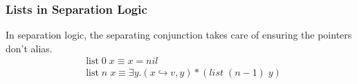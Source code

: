 \documentclass{beamer}
\begin{document}
\begin{frame}
\frametitle{Lists in Separation Logic}
In separation logic, the separating conjunction takes care of ensuring
the pointers don't alias.
\begin{align*}
    & \textrm{list} \; 0 \; x \equiv x = nil
    \\
    & \textrm{list} \; n \; x \equiv \exists y. (x \hookrightarrow v,y) * (list \; (n-1) \; y)
\end{align*}
\end{frame}
\end{document}
